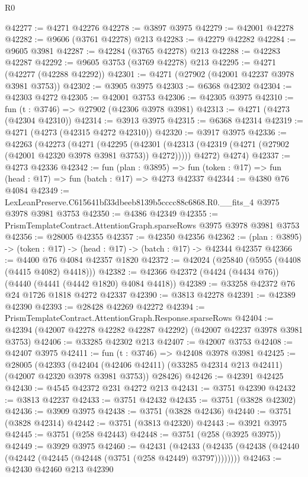 \begin{lexlean}{R0}
\begin{coremodule}
@42277 := @4271 @42276
@42278 := @3897 @3975
@42279 := @42001 @42278
@42282 := @9606 (@3761 @42278) @213
@42283 := @42279 @42282
@42284 := @9605 @3981
@42287 := @42284 (@3765 @42278) @213
@42288 := @42283 @42287
@42292 := @9605 @3753 (@3769 @42278) @213
@42295 := @4271 (@42277 (@42288 @42292))
@42301 := @4271 (@27902 (@42001 @42237 @3978 @3981 @3753))
@42302 := @3905 @3975
@42303 := @6368 @42302
@42304 := @42303 @4272
@42305 := @42001 @3753
@42306 := @42305 @3975
@42310 := fun (t : @3746) => @27902 (@42306 @3978 @3981)
@42313 := @4271 (@4273 (@42304 @42310))
@42314 := @3913 @3975
@42315 := @6368 @42314
@42319 := @4271 (@4273 (@42315 @4272 @42310))
@42320 := @3917 @3975
@42336 := @42263
    (@42273
      (@4271
        (@42295 (@42301 (@42313 (@42319 (@4271 (@27902 (@42001 @42320 @3978 @3981 @3753)) @4272)))))
        @4272)
      @4274)
@42337 := @4273 @42336
@42342 := fun (plan : @3895) =>
  fun (token : @17) => fun (head : @17) => fun (batch : @17) => @4273 @42337
@42344 := @4380 @76 @4084
@42349 := LexLeanPreserve.C615641bf33dbeeb8139b5cccc88c6868.R0.__fits_4 @3975 @3978 @3981 @3753
@42350 := @4386 @42349
@42355 := PrismTemplateContract.AttentionGraph.sparseRows @3975 @3978 @3981 @3753
@42356 := @28005 @42355
@42357 := @42350 @42356
@42362 := (plan : @3895) -> (token : @17) -> (head : @17) -> (batch : @17) -> @42344 @42357
@42366 := @4400 @76 @4084 @42357 @1820
@42372 := @42024 (@25840 (@5955 (@4408 (@4415 @4082) @4418)))
@42382 := @42366 @42372 (@4424 (@4434 @76)) (@4440 (@4441 (@4442 @1820) @4084 @4418))
@42389 := @33258 @42372 @76 @24 @1726 @1818 @4272 @42337
@42390 := @3813 @42278
@42391 := @42389 @42390
@42393 := @28428 @42269 @42272
@42394 := PrismTemplateContract.AttentionGraph.Response.sparseRows
@42404 := @42394 (@42007 @42278 @42282 @42287 @42292) (@42007 @42237 @3978 @3981 @3753)
@42406 := @33285 @42302 @213
@42407 := @42007 @3753
@42408 := @42407 @3975
@42411 := fun (t : @3746) => @42408 @3978 @3981
@42425 := @28005
    (@42393
      (@42404 (@42406 @42411) (@33285 @42314 @213 @42411) (@42007 @42320 @3978 @3981 @3753))
      @28426)
@42426 := @42391 @42425
@42430 := @4545 @42372 @231 @4272 @213
@42431 := @3751 @42390
@42432 := @3813 @42237
@42433 := @3751 @42432
@42435 := @3751 (@3828 @42302)
@42436 := @3909 @3975
@42438 := @3751 (@3828 @42436)
@42440 := @3751 (@3828 @42314)
@42442 := @3751 (@3813 @42320)
@42443 := @3921 @3975
@42445 := @3751 (@258 @42443)
@42448 := @3751 (@258 (@3925 @3975))
@42449 := @3929 @3975
@42460 := @42431
    (@42433 (@42435 (@42438 (@42440 (@42442 (@42445 (@42448 (@3751 (@258 @42449) @3797))))))))
@42463 := @42430 @42460 @213 @42390

\end{coremodule}
\end{lexlean}
